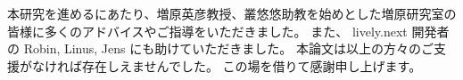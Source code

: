 本研究を進めるにあたり、増原英彦教授、叢悠悠助教を始めとした増原研究室の皆様に多くのアドバイスやご指導をいただきました。
また、 lively.next 開発者の Robin, Linus, Jens にも助けていただきました。
本論文は以上の方々のご支援がなければ存在しえませんでした。
この場を借りて感謝申し上げます。
